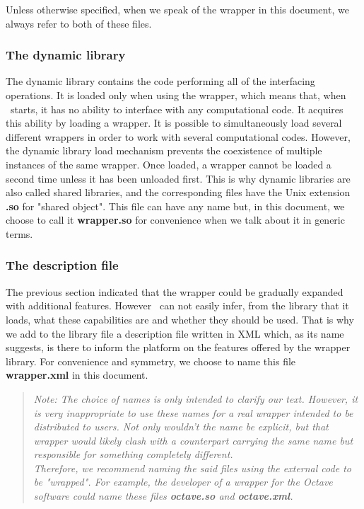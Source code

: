 Unless otherwise specified, when we speak of the wrapper in this document, we always refer to both of these files.

\subsubsection{The dynamic library}

The dynamic library contains the code performing all of the interfacing operations. It is loaded only when using the wrapper, which means that, when \OT\ starts, it has no ability to interface with any computational code. It acquires this ability by loading a wrapper. It is possible to simultaneously load several different wrappers in order to work with several computational codes. However, the dynamic library load mechanism prevents the coexistence of multiple instances of the same wrapper. Once loaded, a wrapper cannot be loaded a second time unless it has been unloaded first. This is why dynamic libraries are also called shared libraries, and the corresponding files have the Unix extension {\bf .so} for "shared object". This file can have any name but, in this document, we choose to call it {\bf wrapper.so} for convenience when we talk about it in generic terms.

\subsubsection{The description file}
The previous section indicated that the wrapper could be gradually expanded with additional features. However \OT\ can not easily infer, from the library that it loads, what these capabilities are and whether they should be used. That is why we add to the library file a description file written in XML which, as its name suggests, is there to inform the platform on the features offered by the wrapper library. For convenience and symmetry, we choose to name this file {\bf wrapper.xml} in this document.

\small
\begin{quote}
  \textit{Note: The choice of names is only intended to clarify our text. However, it is very inappropriate to use these names for a real wrapper intended to be distributed to users. Not only wouldn't the name be explicit, but that wrapper would likely clash with a counterpart carrying the same name but responsible for something completely different.\\
    Therefore, we recommend naming the said files using the external code to be "wrapped". For example, the developer of a wrapper for the Octave software could name these files {\bf octave.so} and {\bf octave.xml}.}
\end{quote}
\normalsize

